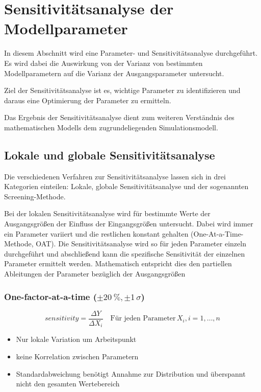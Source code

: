 \pagestyle{milan}
\section{Sensitivitätsanalyse der Modellparameter}\label{sec:sesitivitaetsanalyse}
In diesem Abschnitt wird eine Parameter- und Sensitivitätsanalyse durchgeführt. 
Es wird dabei die Auswirkung von der Varianz von bestimmten Modellparametern auf die Varianz der Ausgangsparameter untersucht.

Ziel der Sensitivitätsanalyse ist es, wichtige Parameter zu identifizieren und daraus eine Optimierung der Parameter zu ermitteln.

Das Ergebnis der Sensitivitätsanalyse dient zum weiteren Verständnis des mathematischen Modells \bzw dem zugrundeliegenden Simulationsmodell.
\subsection{Lokale und globale Sensitivitätsanalyse}

Die verschiedenen Verfahren zur Sensitivitätsanalyse lassen sich in drei Kategorien einteilen: Lokale, globale Sensitivitätsanalyse und der sogenannten Screening-Methode.

Bei der lokalen Sensitivitätsanalyse wird für bestimmte Werte der Ausgangsgrößen der Einfluss der Eingangsgrößen untersucht. Dabei wird immer ein Parameter variiert und die restlichen konstant gehalten (One-At-a-Time-Methode, OAT).
Die Sensitivitätsanalyse wird so für jeden Parameter einzeln durchgeführt und abschließend kann die spezifische Sensitivität der einzelnen Parameter ermittelt werden.
Mathematisch entspricht dies den partiellen Ableitungen der Parameter bezüglich der Ausgangsgrößen

\subsubsection*{One-factor-at-a-time ($\pm \SI{20}{\percent}, \pm 1\, \sigma$)}

\begin{equation}
    sensitivity=\frac{\Delta Y}{\Delta X_{i}} \quad \textrm{Für jeden Parameter}\,X_i, i=1,\dots,n
\end{equation}
\begin{itemize}
    \item Nur lokale Variation um Arbeitspunkt 
    \item keine Korrelation zwischen Parametern
    \item Standardabweichung benötigt Annahme zur Distribution und überspannt nicht den gesamten Wertebereich
\end{itemize}

